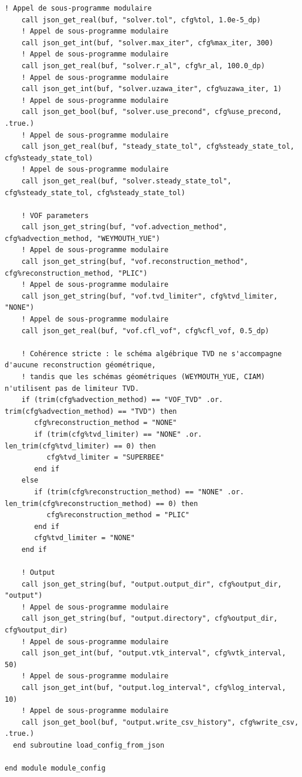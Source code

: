 \documentclass[10pt,a4paper,oneside]{book}
\begin{document}
\begin{lstlisting}[language={[95]Fortran}]
    ! Appel de sous-programme modulaire
    call json_get_real(buf, "solver.tol", cfg%tol, 1.0e-5_dp)
    ! Appel de sous-programme modulaire
    call json_get_int(buf, "solver.max_iter", cfg%max_iter, 300)
    ! Appel de sous-programme modulaire
    call json_get_real(buf, "solver.r_al", cfg%r_al, 100.0_dp)
    ! Appel de sous-programme modulaire
    call json_get_int(buf, "solver.uzawa_iter", cfg%uzawa_iter, 1)
    ! Appel de sous-programme modulaire
    call json_get_bool(buf, "solver.use_precond", cfg%use_precond, .true.)
    ! Appel de sous-programme modulaire
    call json_get_real(buf, "steady_state_tol", cfg%steady_state_tol, cfg%steady_state_tol)
    ! Appel de sous-programme modulaire
    call json_get_real(buf, "solver.steady_state_tol", cfg%steady_state_tol, cfg%steady_state_tol)

    ! VOF parameters
    call json_get_string(buf, "vof.advection_method", cfg%advection_method, "WEYMOUTH_YUE")
    ! Appel de sous-programme modulaire
    call json_get_string(buf, "vof.reconstruction_method", cfg%reconstruction_method, "PLIC")
    ! Appel de sous-programme modulaire
    call json_get_string(buf, "vof.tvd_limiter", cfg%tvd_limiter, "NONE")
    ! Appel de sous-programme modulaire
    call json_get_real(buf, "vof.cfl_vof", cfg%cfl_vof, 0.5_dp)

    ! Cohérence stricte : le schéma algébrique TVD ne s'accompagne d'aucune reconstruction géométrique,
    ! tandis que les schémas géométriques (WEYMOUTH_YUE, CIAM) n'utilisent pas de limiteur TVD.
    if (trim(cfg%advection_method) == "VOF_TVD" .or. trim(cfg%advection_method) == "TVD") then
       cfg%reconstruction_method = "NONE"
       if (trim(cfg%tvd_limiter) == "NONE" .or. len_trim(cfg%tvd_limiter) == 0) then
          cfg%tvd_limiter = "SUPERBEE"
       end if
    else
       if (trim(cfg%reconstruction_method) == "NONE" .or. len_trim(cfg%reconstruction_method) == 0) then
          cfg%reconstruction_method = "PLIC"
       end if
       cfg%tvd_limiter = "NONE"
    end if

    ! Output
    call json_get_string(buf, "output.output_dir", cfg%output_dir, "output")
    ! Appel de sous-programme modulaire
    call json_get_string(buf, "output.directory", cfg%output_dir, cfg%output_dir)
    ! Appel de sous-programme modulaire
    call json_get_int(buf, "output.vtk_interval", cfg%vtk_interval, 50)
    ! Appel de sous-programme modulaire
    call json_get_int(buf, "output.log_interval", cfg%log_interval, 10)
    ! Appel de sous-programme modulaire
    call json_get_bool(buf, "output.write_csv_history", cfg%write_csv, .true.)
  end subroutine load_config_from_json

end module module_config

\end{lstlisting}
\end{document}
